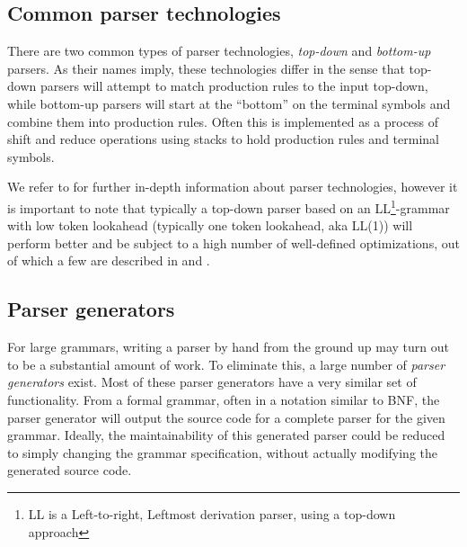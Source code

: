 \subsection{Common parser technologies}
There are two common types of parser technologies, \textit{top-down} and
\textit{bottom-up} parsers. As their names imply, these technologies differ in
the sense that top-down parsers will attempt to match production rules to the
input top-down, while bottom-up parsers will start at the ``bottom'' on the
terminal symbols and combine them into production rules. Often this is
implemented as a process of shift and reduce operations using stacks to hold
production rules and terminal symbols.

We refer to \cite{compiler_tech} for further in-depth information about parser
technologies, however it is important to note that typically a top-down parser
based on an LL\footnote{LL is a Left-to-right, Leftmost derivation
parser, using a top-down approach}-grammar with low token lookahead (typically
one token lookahead, aka LL(1)) will perform better and be subject to a high
number of well-defined optimizations, out of which a few are described in
\cite{compiler_tech} and \cite{DBLP:books/cu/Appel1998c}.

\subsection{Parser generators}
For large grammars, writing a parser by hand from the ground up may turn out to
be a substantial amount of work. To eliminate this, a large number of
\textit{parser generators} exist. Most of these parser generators have a very
similar set of functionality. From a formal grammar, often in a notation
similar to BNF, the parser generator will output the source code for a
complete parser for the given grammar. Ideally, the maintainability of this
generated parser could be reduced to simply changing the grammar specification,
without actually modifying the generated source code.

